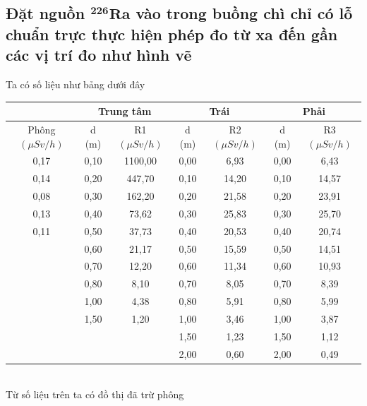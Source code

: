 \documentclass{article}
\begin{document}
\setcounter{section}{1}

\vspace{0.5cm}

\subsection{Đặt nguồn $\mathbf{{}^{226}Ra}$ vào trong buồng chì chỉ có lỗ chuẩn trực thực hiện phép đo từ xa đến gần các vị trí đo như hình vẽ}

Ta có số liệu như bảng dưới đây
\begin{table}[!ht]
    \centering
    \begin{tabular}{*7c}
    \hline
        \textbf{} & \multicolumn{2}{c}{\textbf{Trung tâm}}  & \multicolumn{2}{c}{\textbf{Trái}} & \multicolumn{2}{c}{\textbf{Phải}}  \\ \hline
        Phông $(\mu Sv/h)$ & d (m) & R1 $(\mu Sv/h)$ & d (m) & R2 $(\mu Sv/h)$ & d (m) & R3 $(\mu Sv/h)$ \\ 
        0,17 & 0,10 & 1100,00 & 0,00 & 6,93 & 0,00 & 6,43 \\ 
        0,14 & 0,20 & 447,70 & 0,10 & 14,20 & 0,10 & 14,57 \\ 
        0,08 & 0,30 & 162,20 & 0,20 & 21,58 & 0,20 & 23,91 \\ 
        0,13 & 0,40 & 73,62 & 0,30 & 25,83 & 0,30 & 25,70 \\ 
        0,11 & 0,50 & 37,73 & 0,40 & 20,53 & 0,40 & 20,74 \\ 
        ~ & 0,60 & 21,17 & 0,50 & 15,59 & 0,50 & 14,51 \\ 
        ~ & 0,70 & 12,20 & 0,60 & 11,34 & 0,60 & 10,93 \\ 
        ~ & 0,80 & 8,10 & 0,70 & 8,05 & 0,70 & 8,39 \\ 
        ~ & 1,00 & 4,38 & 0,80 & 5,91 & 0,80 & 5,99 \\ 
        ~ & 1,50 & 1,20 & 1,00 & 3,46 & 1,00 & 3,87 \\ 
        ~ & ~ & ~ & 1,50 & 1,23 & 1,50 & 1,12 \\ 
        ~ & ~ & ~ & 2,00 & 0,60 & 2,00 & 0,49 \\ \hline
    \end{tabular}
\end{table} \\
Từ số liệu trên ta có đồ thị đã trừ phông
\end{document}
